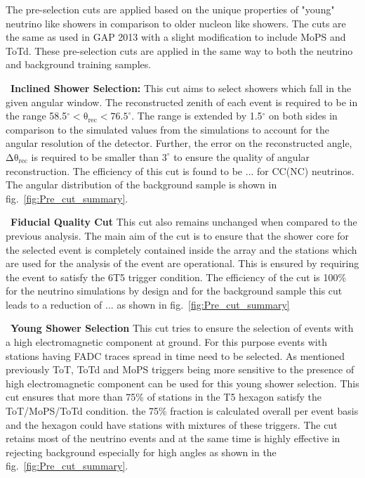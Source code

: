 The pre-selection cuts are applied based on the unique properties of "young" neutrino like showers in comparison to older nucleon like showers. The cuts are the same as used in GAP 2013 with a slight modification to include MoPS and ToTd. These pre-selection cuts are applied in the same way to both the neutrino and background training samples. 
\begin{description}
  \item ~\textbf{Inclined Shower Selection:} This cut aims to select showers which fall in the given angular window. The reconstructed zenith of each event is required to be in the range 58.5$^{\circ} < \mathrm{\theta_{rec} < 76.5^{\circ}}$. The range is extended by 1.5$^\circ$ on both sides in comparison to the simulated values from the simulations to account for the angular resolution of the detector. Further, the error on the reconstructed angle, $\mathrm{\Delta \theta_{rec}}$ is required to be smaller than $3^\circ$ to ensure the quality of angular reconstruction. The efficiency of this cut is found to be ... for CC(NC) neutrinos. The angular distribution of the background sample is shown in fig.~\ref{fig:Pre_cut_summary}.
  \item ~\textbf{Fiducial Quality Cut} This cut also remains unchanged when compared to the previous analysis. The main aim of the cut is to ensure that the shower core for the selected event is completely contained inside the array and the stations which are used for the analysis of the event are operational. This is ensured by requiring the event to satisfy the 6T5 trigger condition. The efficiency of the cut is 100\% for the neutrino simulations by design and for the background sample this cut leads to a reduction of ... as shown in fig.~\ref{fig:Pre_cut_summary}   
  \item ~\textbf{Young Shower Selection} This cut tries to ensure the selection of events with a high electromagnetic component at ground. For this purpose events with stations having FADC traces spread in time need to be selected. As mentioned previously ToT, ToTd and MoPS triggers being more sensitive to the presence of high electromagnetic component can be used for this young shower selection. This cut ensures that more than 75\% of stations in the T5 hexagon satisfy the ToT/MoPS/ToTd condition. the 75\% fraction is calculated overall per event basis and the hexagon could have stations with mixtures of these triggers. The cut retains most of the neutrino events and at the same time is highly effective in rejecting background especially for high angles as shown in the fig.~\ref{fig:Pre_cut_summary}.

\end{description}
